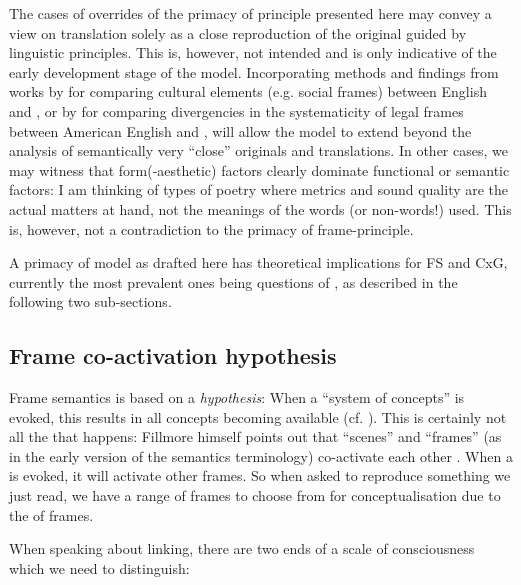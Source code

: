 \documentclass[output=paper]{LSP/langsci}
\begin{document}
The cases of overrides of the primacy of  principle presented here may convey a view on translation solely as a close reproduction of the original guided by linguistic principles. This is, however, not intended and is only indicative of the early development stage of the model. Incorporating methods and findings from works by \citet{Rojo2002} for comparing cultural elements (e.g. social frames) between English and , or by \citet{Bertoldi2012} for comparing divergencies in the systematicity of legal frames between American English and , will allow the model to extend beyond the analysis of  semantically very ``close'' originals and translations. In other cases, we may witness that form(-aesthetic) factors clearly dominate functional or semantic factors: I am thinking of types of poetry where metrics and sound quality are the actual matters at hand, not the meanings of the words (or non-words!) used. This is, however, not a contradiction to the primacy of frame-principle.

A primacy of  model as drafted here has theoretical implications for FS and CxG, currently the most prevalent ones being questions of , as described in the following two sub-sections.

\subsection{Frame co-activation hypothesis}\label{czulo:sec:4.1}

Frame semantics is based on a \textit{ hypothesis}: When a ``system of concepts'' is evoked, this results in all concepts becoming available (cf. \citealt{Petruck1996}). This is certainly not all the  that happens: Fillmore himself points out that ``scenes'' and ``frames'' (as in the early version of the  semantics terminology) co-activate each other \citep[124]{Fillmore1975}. When a  is evoked, it will activate other frames. So when asked to reproduce something we just read, we have a range of frames to choose from for conceptualisation due to the  of frames. 

When speaking about linking, there are two ends of a scale of consciousness which we need to distinguish:
\end{document}
